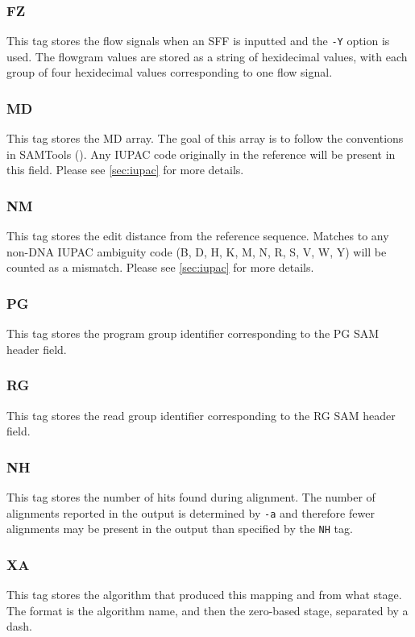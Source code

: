 \documentclass[a4paper,12pt]{book}
\newcommand{\TT}[1]{{\tt #1}} %
\begin{document}
\subsubsection{FZ}
This tag stores the flow signals when an SFF is inputted and the \TT{-Y} option is used.
The flowgram values are stored as a string of hexidecimal values, with each group of four hexidecimal values corresponding to one flow signal.

\subsubsection{MD}
This tag stores the MD array.
The goal of this array is to follow the conventions in SAMTools (\cite{SAM-format}).
Any IUPAC code originally in the reference will be present in this field.
Please see \autoref{sec:iupac} for more details. 

\subsubsection{NM}
This tag stores the edit distance from the reference sequence.
Matches to any non-DNA IUPAC ambiguity code (B, D, H, K, M, N, R, S, V, W, Y) will be counted as a mismatch.
Please see \autoref{sec:iupac} for more details. 

\subsubsection{PG}
This tag stores the program group identifier corresponding to the PG SAM header field.

\subsubsection{RG}
This tag stores the read group identifier corresponding to the RG SAM header field.

\subsubsection{NH}
This tag stores the number of hits found during alignment.
The number of alignments reported in the output is determined by \TT{-a} and therefore fewer alignments may be present in the output than specified by the \TT{NH} tag.

\subsubsection{XA}
This tag stores the algorithm that produced this mapping and from what stage.
The format is the algorithm name, and then the zero-based stage, separated by a dash.
\end{document}
